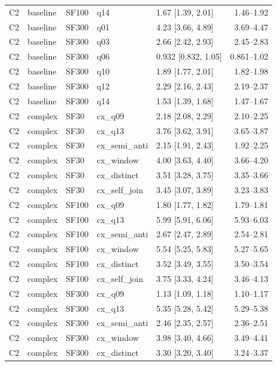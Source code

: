 \begin{longtable}{lllllr}
C2 & baseline & SF100 & q14 & 1.67 [1.39, 2.01] & 1.46--1.92 \\
C2 & baseline & SF300 & q01 & 4.23 [3.66, 4.89] & 3.69--4.47 \\
C2 & baseline & SF300 & q03 & 2.66 [2.42, 2.93] & 2.45--2.83 \\
C2 & baseline & SF300 & q06 & 0.932 [0.832, 1.05] & 0.861--1.02 \\
C2 & baseline & SF300 & q10 & 1.89 [1.77, 2.01] & 1.82--1.98 \\
C2 & baseline & SF300 & q12 & 2.29 [2.16, 2.43] & 2.19--2.37 \\
C2 & baseline & SF300 & q14 & 1.53 [1.39, 1.68] & 1.47--1.67 \\
C2 & complex & SF30 & cx\_q09 & 2.18 [2.08, 2.29] & 2.10--2.25 \\
C2 & complex & SF30 & cx\_q13 & 3.76 [3.62, 3.91] & 3.65--3.87 \\
C2 & complex & SF30 & cx\_semi\_anti & 2.15 [1.91, 2.43] & 1.92--2.25 \\
C2 & complex & SF30 & cx\_window & 4.00 [3.63, 4.40] & 3.66--4.20 \\
C2 & complex & SF30 & cx\_distinct & 3.51 [3.28, 3.75] & 3.35--3.66 \\
C2 & complex & SF30 & cx\_self\_join & 3.45 [3.07, 3.89] & 3.23--3.83 \\
C2 & complex & SF100 & cx\_q09 & 1.80 [1.77, 1.82] & 1.79--1.81 \\
C2 & complex & SF100 & cx\_q13 & 5.99 [5.91, 6.06] & 5.93--6.03 \\
C2 & complex & SF100 & cx\_semi\_anti & 2.67 [2.47, 2.89] & 2.54--2.81 \\
C2 & complex & SF100 & cx\_window & 5.54 [5.25, 5.83] & 5.27--5.65 \\
C2 & complex & SF100 & cx\_distinct & 3.52 [3.49, 3.55] & 3.50--3.54 \\
C2 & complex & SF100 & cx\_self\_join & 3.75 [3.33, 4.24] & 3.46--4.13 \\
C2 & complex & SF300 & cx\_q09 & 1.13 [1.09, 1.18] & 1.10--1.17 \\
C2 & complex & SF300 & cx\_q13 & 5.35 [5.28, 5.42] & 5.29--5.38 \\
C2 & complex & SF300 & cx\_semi\_anti & 2.46 [2.35, 2.57] & 2.36--2.51 \\
C2 & complex & SF300 & cx\_window & 3.98 [3.40, 4.66] & 3.49--4.41 \\
C2 & complex & SF300 & cx\_distinct & 3.30 [3.20, 3.40] & 3.24--3.37 \\

\end{longtable}
